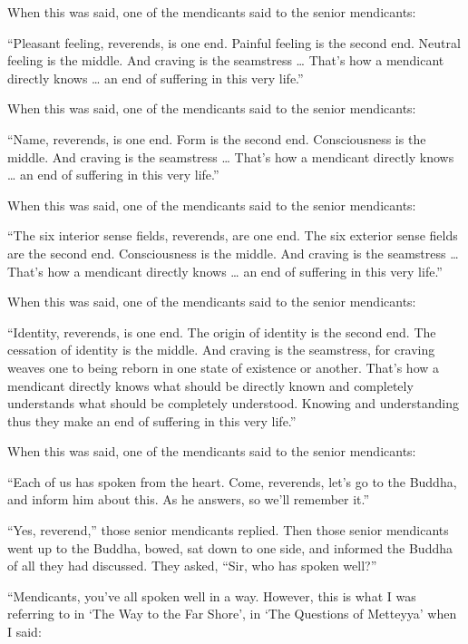 \documentclass[12pt,openany]{book}%
\begin{document}
When this was said, one of the mendicants said to the senior mendicants: 

“Pleasant feeling, reverends, is one end. Painful feeling is the second end. Neutral feeling is the middle. And craving is the seamstress … That’s how a mendicant directly knows … an end of suffering in this very life.” 

When this was said, one of the mendicants said to the senior mendicants: 

“Name, reverends, is one end. Form is the second end. Consciousness is the middle. And craving is the seamstress … That’s how a mendicant directly knows … an end of suffering in this very life.” 

When this was said, one of the mendicants said to the senior mendicants: 

“The six interior sense fields, reverends, are one end. The six exterior sense fields are the second end. Consciousness is the middle. And craving is the seamstress … That’s how a mendicant directly knows … an end of suffering in this very life.” 

When this was said, one of the mendicants said to the senior mendicants: 

“Identity, reverends, is one end. The origin of identity is the second end. The cessation of identity is the middle. And craving is the seamstress, for craving weaves one to being reborn in one state of existence or another. That’s how a mendicant directly knows what should be directly known and completely understands what should be completely understood. Knowing and understanding thus they make an end of suffering in this very life.” 

When this was said, one of the mendicants said to the senior mendicants: 

“Each of us has spoken from the heart. Come, reverends, let’s go to the Buddha, and inform him about this. As he answers, so we’ll remember it.” 

“Yes, reverend,” those senior mendicants replied. Then those senior mendicants went up to the Buddha, bowed, sat down to one side, and informed the Buddha of all they had discussed. They asked, “Sir, who has spoken well?” 

“Mendicants, you’ve all spoken well in a way. However, this is what I was referring to in ‘The Way to the Far Shore’, in ‘The Questions of Metteyya’ when I said: 
\end{document}
